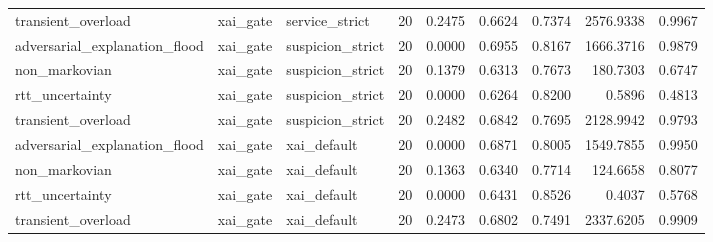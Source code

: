 \begin{table}[t]
\begin{tabular}{lllrrrrrr}
transient\_overload & xai\_gate & service\_strict & 20 & 0.2475 & 0.6624 & 0.7374 & 2576.9338 & 0.9967 \\
adversarial\_explanation\_flood & xai\_gate & suspicion\_strict & 20 & 0.0000 & 0.6955 & 0.8167 & 1666.3716 & 0.9879 \\
non\_markovian & xai\_gate & suspicion\_strict & 20 & 0.1379 & 0.6313 & 0.7673 & 180.7303 & 0.6747 \\
rtt\_uncertainty & xai\_gate & suspicion\_strict & 20 & 0.0000 & 0.6264 & 0.8200 & 0.5896 & 0.4813 \\
transient\_overload & xai\_gate & suspicion\_strict & 20 & 0.2482 & 0.6842 & 0.7695 & 2128.9942 & 0.9793 \\
adversarial\_explanation\_flood & xai\_gate & xai\_default & 20 & 0.0000 & 0.6871 & 0.8005 & 1549.7855 & 0.9950 \\
non\_markovian & xai\_gate & xai\_default & 20 & 0.1363 & 0.6340 & 0.7714 & 124.6658 & 0.8077 \\
rtt\_uncertainty & xai\_gate & xai\_default & 20 & 0.0000 & 0.6431 & 0.8526 & 0.4037 & 0.5768 \\
transient\_overload & xai\_gate & xai\_default & 20 & 0.2473 & 0.6802 & 0.7491 & 2337.6205 & 0.9909 \\
\bottomrule
\end{tabular}
\end{table}
